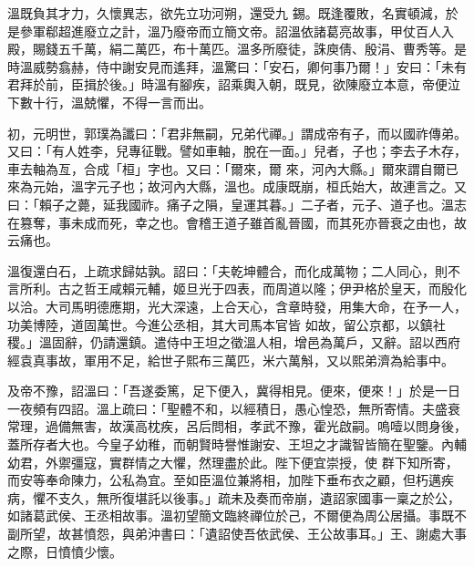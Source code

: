 \begin{pinyinscope}
 溫既負其才力，久懷異志，欲先立功河朔，還受九
 錫。既逢覆敗，名實頓減，於是參軍郗超進廢立之計，溫乃廢帝而立簡文帝。詔溫依諸葛亮故事，甲仗百人入殿，賜錢五千萬，絹二萬匹，布十萬匹。溫多所廢徒，誅庾倩、殷涓、曹秀等。是時溫威勢翕赫，侍中謝安見而遙拜，溫驚曰：「安石，卿何事乃爾！」安曰：「未有君拜於前，臣揖於後。」時溫有腳疾，詔乘輿入朝，既見，欲陳廢立本意，帝便泣下數十行，溫兢懼，不得一言而出。



 初，元明世，郭璞為讖曰：「君非無嗣，兄弟代禪。」謂成帝有子，而以國祚傳弟。又曰：「有人姓李，兒專征戰。譬如車軸，脫在一面。」兒者，子也；李去子木存，車去軸為亙，合成「桓」字也。又曰：「爾來，爾
 來，河內大縣。」爾來謂自爾已來為元始，溫字元子也；故河內大縣，溫也。成康既崩，桓氏始大，故連言之。又曰：「賴子之薨，延我國祚。痛子之隕，皇運其暮。」二子者，元子、道子也。溫志在篡奪，事未成而死，幸之也。會稽王道子雖首亂晉國，而其死亦晉衰之由也，故云痛也。



 溫復還白石，上疏求歸姑孰。詔曰：「夫乾坤體合，而化成萬物；二人同心，則不言所利。古之哲王咸賴元輔，姬旦光于四表，而周道以隆；伊尹格於皇天，而殷化以洽。大司馬明德應期，光大深遠，上合天心，含章時發，用集大命，在予一人，功美博陸，道固萬世。今進公丞相，其大司馬本官皆
 如故，留公京都，以鎮社稷。」溫固辭，仍請還鎮。遣侍中王坦之徵溫人相，增邑為萬戶，又辭。詔以西府經袁真事故，軍用不足，給世子熙布三萬匹，米六萬斛，又以熙弟濟為給事中。



 及帝不豫，詔溫曰：「吾遂委篤，足下便入，冀得相見。便來，便來！」於是一日一夜頻有四詔。溫上疏曰：「聖體不和，以經積日，愚心惶恐，無所寄情。夫盛衰常理，過備無害，故漢高枕疾，呂后問相，孝武不豫，霍光啟嗣。嗚噎以問身後，蓋所存者大也。今皇子幼稚，而朝賢時譽惟謝安、王坦之才識智皆簡在聖鑒。內輔幼君，外禦彊寇，實群情之大懼，然理盡於此。陛下便宜崇授，使
 群下知所寄，而安等奉命陳力，公私為宜。至如臣溫位兼將相，加陛下垂布衣之顧，但朽邁疾病，懼不支久，無所復堪託以後事。」疏未及奏而帝崩，遺詔家國事一稟之於公，如諸葛武侯、王丞相故事。溫初望簡文臨終禪位於己，不爾便為周公居攝。事既不副所望，故甚憤怨，與弟沖書曰：「遺詔使吾依武侯、王公故事耳。」王、謝處大事之際，日憤憤少懷。




\end{pinyinscope}
